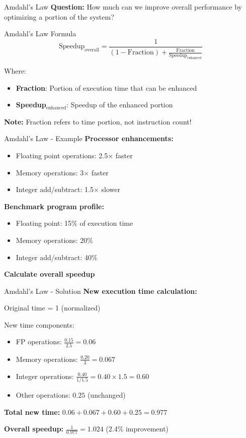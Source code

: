 \documentclass[aspectratio=169,12pt]{beamer}
\begin{document}
\begin{frame}{Amdahl's Law}
\textbf{Question:} How much can we improve overall performance by optimizing a portion of the system?

\begin{block}{Amdahl's Law Formula}
$$\text{Speedup}_\text{overall} = \frac{1}{(1 - \text{Fraction}) + \frac{\text{Fraction}}{\text{Speedup}_\text{enhanced}}}$$
\end{block}

Where:
\begin{itemize}
    \item \textbf{Fraction}: Portion of execution time that can be enhanced
    \item \textbf{Speedup$_\text{enhanced}$}: Speedup of the enhanced portion
\end{itemize}

\textbf{Note:} Fraction refers to time portion, not instruction count!
\end{frame}

\begin{frame}{Amdahl's Law - Example}
\textbf{Processor enhancements:}
\begin{itemize}
    \item Floating point operations: 2.5× faster
    \item Memory operations: 3× faster
    \item Integer add/subtract: 1.5× slower
\end{itemize}

\textbf{Benchmark program profile:}
\begin{itemize}
    \item Floating point: 15\% of execution time
    \item Memory operations: 20\%
    \item Integer add/subtract: 40\%
\end{itemize}

\textbf{Calculate overall speedup}
\end{frame}

\begin{frame}{Amdahl's Law - Solution}
\textbf{New execution time calculation:}

Original time = 1 (normalized)

New time components:
\begin{itemize}
    \item FP operations: $\frac{0.15}{2.5} = 0.06$
    \item Memory operations: $\frac{0.20}{3} = 0.067$
    \item Integer operations: $\frac{0.40}{1/1.5} = 0.40 \times 1.5 = 0.60$
    \item Other operations: $0.25$ (unchanged)
\end{itemize}

\textbf{Total new time:} $0.06 + 0.067 + 0.60 + 0.25 = 0.977$

\textbf{Overall speedup:} $\frac{1}{0.977} = 1.024$ (2.4\% improvement)
\end{frame}
\end{document}
